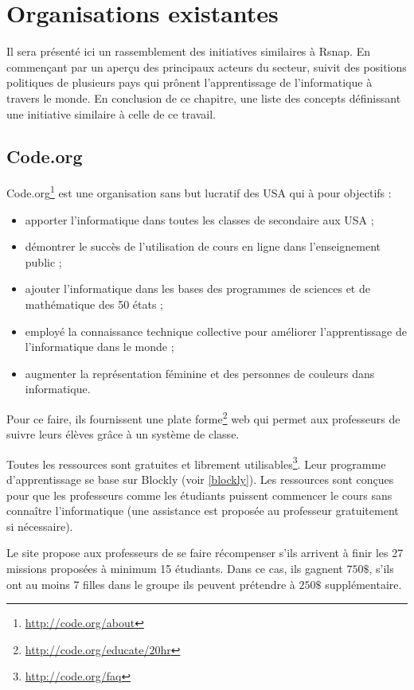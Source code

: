 \section{Organisations existantes}
Il sera présenté ici un rassemblement des initiatives similaires à Rsnap. En commençant par un aperçu des principaux acteurs du secteur, suivit des positions politiques de plusieurs pays qui prônent l'apprentissage de l'informatique à travers le monde. En conclusion de ce chapitre, une liste des concepts définissant une initiative similaire à celle de ce travail.
\subsection{Code.org}
Code.org\footnote{\url{http://code.org/about}} est une organisation sans but lucratif des USA qui à pour objectifs :
\begin{itemize}
  \item apporter l'informatique dans toutes les classes de secondaire aux USA ;
  \item démontrer le succès de l'utilisation de cours en ligne dans l'enseignement public ;
  \item ajouter l'informatique dans les bases des programmes de sciences et de mathématique des 50 états ;
  \item employé la connaissance technique collective pour améliorer l'apprentissage de l'informatique dans le monde ;
  \item augmenter la représentation féminine et des personnes de couleurs dans informatique.
\end{itemize}

Pour ce faire, ils fournissent une plate forme\footnote{\url{http://code.org/educate/20hr}} web qui permet aux professeurs de suivre leurs élèves grâce à un système de classe.

Toutes les ressources sont gratuites et librement utilisables\footnote{\url{http://code.org/faq}}. Leur programme d'apprentissage se base sur Blockly (voir \ref{blockly}).
Les ressources sont conçues pour que les professeurs comme les étudiants puissent commencer le cours sans connaître l'informatique (une assistance est proposée au professeur gratuitement si nécessaire).

Le site propose aux professeurs de se faire récompenser s'ils arrivent à finir les 27 missions proposées à minimum 15 étudiants. Dans ce cas, ils gagnent $750\$$, s'ils ont au moins 7 filles dans le groupe ils peuvent prétendre à $250\$$ supplémentaire.

